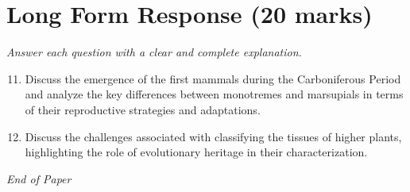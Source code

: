 \documentclass[12pt]{article}
\begin{document}
\section*{Long Form Response (20 marks)}
\textit{Answer each question with a clear and complete explanation.}
\begin{enumerate}[label=\arabic*.]
\setcounter{enumi}{10}
\item Discuss the emergence of the first mammals during the Carboniferous Period and analyze the key differences between monotremes and marsupials in terms of their reproductive strategies and adaptations.
\item Discuss the challenges associated with classifying the tissues of higher plants, highlighting the role of evolutionary heritage in their characterization.
\end{enumerate}

\vfill
\noindent\textit{End of Paper}
\end{document}
